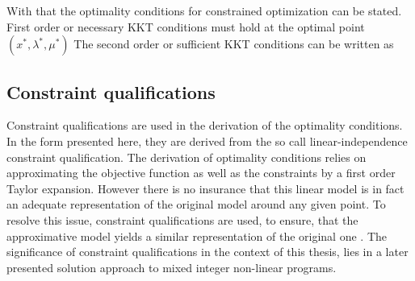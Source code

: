     With that the optimality conditions for constrained optimization can be stated.
    First order or necessary KKT conditions must hold at the optimal point $(x^{\ast}, \lambda^{\ast}, \mu^{\ast})$
    The second order or sufficient KKT conditions can be written as

    \subsection{Constraint qualifications}
    \label{sec:opt:theory:cq}

    Constraint qualifications are used in the derivation of the optimality conditions. In the form presented here, 
    they are derived from the so call linear-independence constraint qualification. The derivation of 
    optimality conditions relies on approximating the objective function as well as the constraints by a 
    first order Taylor expansion. However there is no insurance that this linear model is in fact 
    an adequate representation of the original model around any given point. To resolve this issue, constraint 
    qualifications are used, to ensure, that the approximative model yields a similar representation of the 
    original one \cite{Nocedal.2006}. The significance of constraint qualifications in the context of this thesis, lies in a later 
    presented solution approach to mixed integer non-linear programs. 

